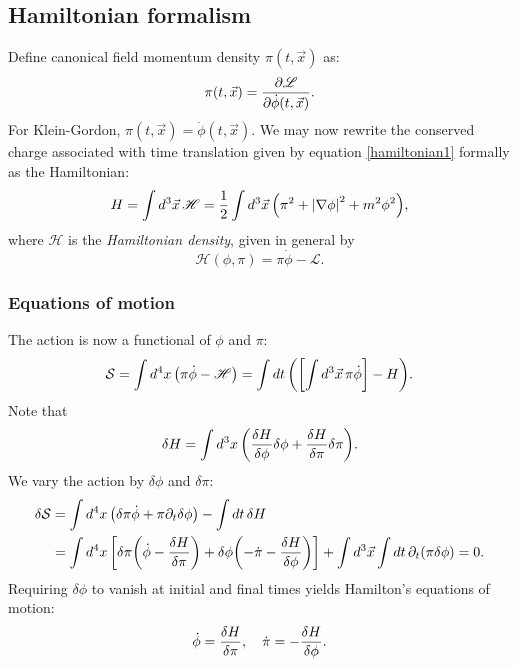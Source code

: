 \documentclass{article}
\begin{document}
\subsection{Hamiltonian formalism}
Define canonical field momentum density $ \pi(t, \vec{x}) $ as:
\begin{equation}
	\pi(t, \vec{x}) = \pdv{\mathscr{L}}{\dot{\phi}(t,\vec{x})}.
\end{equation}
For Klein-Gordon, $ \pi(t,\vec{x}) = \dot{\phi}(t,\vec{x}) $. We may now rewrite the conserved charge associated with time translation given by equation \eqref{hamiltonian1} formally as the Hamiltonian:
\begin{equation}
	H = \int \dd[3]{\vec{x}} \mathscr{H} = \frac{1}{2} \int \dd[3]{\vec{x}} \qty(\pi^{2} + \abs{\nabla \phi}^{2} + m^{2} \phi^{2}),
\end{equation}
where $ \mathscr{H} $ is the \textit{Hamiltonian density}, given in general by
\begin{equation}
	\mathscr{H}(\phi, \pi) = \pi \dot{\phi} - \mathscr{L}.
\end{equation}
\subsubsection{Equations of motion}
The action is now a functional of $ \phi $ and $ \pi $:
\begin{equation}
	\mathcal{S} = \int \dd[4]{x} \qty(\pi \dot{\phi} - \mathscr{H}) = \int \dd{t} \qty(\qty[\int \dd[3]{\vec{x}} \pi \dot{\phi}] - H).
\end{equation}
Note that
\begin{equation}
	\delta H = \int \dd[3]{x} \qty(\fdv{H}{\phi} \delta \phi + \fdv{H}{\pi} \delta \pi).
\end{equation}
We vary the action by $ \delta \phi $ and $ \delta \pi $:
\begin{align}
	\begin{split}
		\delta \mathcal{S} &= \int \dd[4]{x} \qty(\delta \pi \dot{\phi} + \pi \partial_{t} \delta \phi) - \int \dd{t} \delta H \\
		&= \int \dd[4]{x} \qty[\delta \pi \qty(\dot{\phi} - \fdv{H}{\pi}) + \delta \phi \qty(-\dot{\pi} - \fdv{H}{\phi})] + \int \dd[3]{\vec{x}} \int \dd{t} \partial_{t} \qty(\pi \delta \phi)  = 0. 
	\end{split}
\end{align}
Requiring $ \delta \phi $ to vanish at initial and final times yields Hamilton's equations of motion:
\begin{equation}
	\dot{\phi} = \fdv{H}{\pi}, \quad
	\dot{\pi} = - \fdv{H}{\phi}.
\end{equation}
\end{document}
